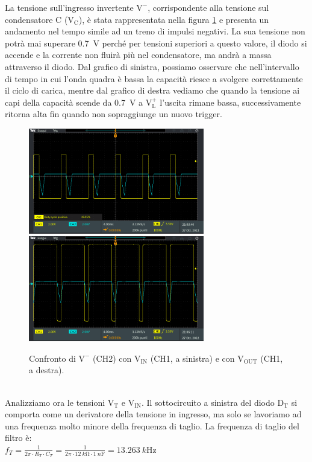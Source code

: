 \documentclass{report}
\begin{document}
La tensione sull'ingresso invertente $\mathrm{V^-}$, corrispondente alla tensione sul condensatore C ($\mathrm{V_C}$), è stata rappresentata nella figura \ref{figura:TEK00004e5} e presenta un andamento nel tempo simile ad un treno di impulsi negativi. La sua tensione non potrà mai superare \SI{0.7}{\volt} perché per tensioni superiori a questo valore, il diodo si accende e la corrente non fluirà più nel condensatore, ma andrà a massa attraverso il diodo. Dal grafico di sinistra, possiamo osservare che nell'intervallo di tempo in cui l'onda quadra è bassa la capacità riesce a svolgere correttamente il ciclo di carica, mentre dal grafico di destra vediamo che quando la tensione ai capi della capacità scende da \SI{0.7}{\volt} a $\mathrm{V_L^+}$ l'uscita rimane bassa, successivamente ritorna alta fin quando non sopraggiunge un nuovo trigger.
\begin{figure}[h!]
	\centering
	\includegraphics[height=4.6cm]{immagini/TEK00004}
	\includegraphics[height=4.6cm]{immagini/TEK00005}
	\caption{Confronto di $\mathrm{V^-}$ (CH2) con $\mathrm{V_{IN}}$ (CH1, a sinistra) e con $\mathrm{V_{OUT}}$ (CH1, a destra).}
	\label{figura:TEK00004e5}
\end{figure}
\\Analizziamo ora le tensioni $\mathrm{V_T}$ e $\mathrm{V_{IN}}$. Il sottocircuito a sinistra del diodo $\mathrm{D_T}$ si comporta come un derivatore della tensione in ingresso, ma solo se lavoriamo ad una frequenza molto minore della frequenza di taglio. La frequenza di taglio del filtro è:
\\[4pt]\indent$\displaystyle{f_T = \frac{1}{2\pi\cdot R_T\cdot C_T} = \frac{1}{2\pi\cdot \SI{12}{k\ohm}\cdot\SI{1}{n\farad}} =\SI{13.263}{k\hertz}}$
\end{document}
